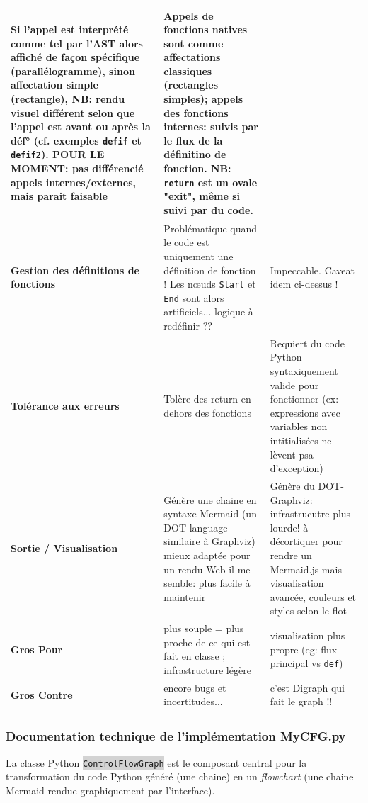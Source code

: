 \documentclass[11pt,a4paper]{article}
\newcommand{\code}[1]{\colorbox{lightgray}{\texttt{\small #1}}}
\begin{document}
\begin{longtable}{|p{3cm}|p{7cm}|p{6cm}|}
Si l'appel est interprété comme tel par l'AST alors affiché de façon spécifique (parallélogramme), sinon affectation simple (rectangle), NB: rendu visuel différent selon que l'appel est avant ou après la déf° (cf. exemples \texttt{defif} et \texttt{defif2}). POUR LE MOMENT: pas différencié appels internes/externes, mais parait faisable & 
Appels de fonctions natives sont comme affectations classiques (rectangles simples); appels des fonctions internes: suivis par le flux de la définitino de fonction. NB: \texttt{return} est un ovale "exit", même si suivi par du code. \\
\hline
\textbf{Gestion des définitions de fonctions} & 
Problématique quand le code est uniquement une définition de fonction ! Les nœuds \texttt{Start} et \texttt{End} sont alors artificiels... logique à redéfinir ??  & 
Impeccable. Caveat idem ci-dessus ! \\
\hline
\textbf{Tolérance aux erreurs} & 
Tolère des return en dehors des fonctions & 
Requiert du code Python syntaxiquement valide pour fonctionner (ex: expressions avec variables non intitialisées ne lèvent psa d'exception) \\
\hline
\textbf{Sortie / Visualisation} & 
Génère une chaine en syntaxe Mermaid (un DOT language similaire à Graphviz) mieux adaptée pour un rendu Web il me semble: plus facile à maintenir & 
Génère du DOT-Graphviz: infrastrucutre plus lourde! à décortiquer pour rendre un Mermaid.js mais visualisation avancée, couleurs et styles selon le flot \\
\hline
\textbf{Gros Pour} & 
plus souple = plus proche de ce qui est fait en classe ; infrastructure légère & 
visualisation plus propre (eg: flux principal vs \texttt{def})  \\
\hline
\textbf{Gros Contre} & 
encore bugs et incertitudes... & 
c'est Digraph qui fait le graph !! \\
\hline
\end{longtable}

\subsubsection{Documentation technique de l’implémentation MyCFG.py}
La classe Python \code{ControlFlowGraph} est le composant central pour la transformation du code Python généré (une chaine) en un \textit{flowchart} (une chaine Mermaid rendue graphiquement par l'interface).
\end{document}
